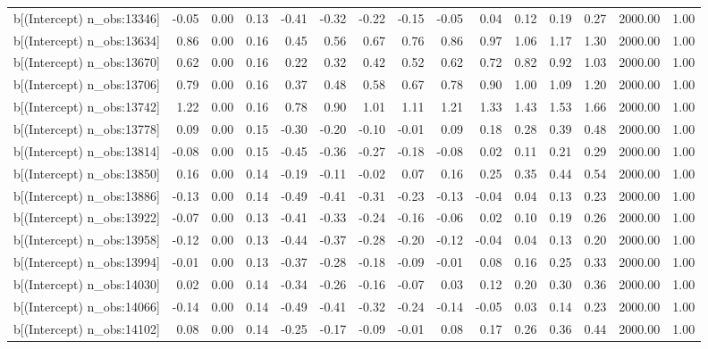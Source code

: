 \begin{table}[ht]
\begin{tabular}{rrrrrrrrrrrrrrr}
  b[(Intercept) n\_obs:13346] & -0.05 & 0.00 & 0.13 & -0.41 & -0.32 & -0.22 & -0.15 & -0.05 & 0.04 & 0.12 & 0.19 & 0.27 & 2000.00 & 1.00 \\ 
  b[(Intercept) n\_obs:13634] & 0.86 & 0.00 & 0.16 & 0.45 & 0.56 & 0.67 & 0.76 & 0.86 & 0.97 & 1.06 & 1.17 & 1.30 & 2000.00 & 1.00 \\ 
  b[(Intercept) n\_obs:13670] & 0.62 & 0.00 & 0.16 & 0.22 & 0.32 & 0.42 & 0.52 & 0.62 & 0.72 & 0.82 & 0.92 & 1.03 & 2000.00 & 1.00 \\ 
  b[(Intercept) n\_obs:13706] & 0.79 & 0.00 & 0.16 & 0.37 & 0.48 & 0.58 & 0.67 & 0.78 & 0.90 & 1.00 & 1.09 & 1.20 & 2000.00 & 1.00 \\ 
  b[(Intercept) n\_obs:13742] & 1.22 & 0.00 & 0.16 & 0.78 & 0.90 & 1.01 & 1.11 & 1.21 & 1.33 & 1.43 & 1.53 & 1.66 & 2000.00 & 1.00 \\ 
  b[(Intercept) n\_obs:13778] & 0.09 & 0.00 & 0.15 & -0.30 & -0.20 & -0.10 & -0.01 & 0.09 & 0.18 & 0.28 & 0.39 & 0.48 & 2000.00 & 1.00 \\ 
  b[(Intercept) n\_obs:13814] & -0.08 & 0.00 & 0.15 & -0.45 & -0.36 & -0.27 & -0.18 & -0.08 & 0.02 & 0.11 & 0.21 & 0.29 & 2000.00 & 1.00 \\ 
  b[(Intercept) n\_obs:13850] & 0.16 & 0.00 & 0.14 & -0.19 & -0.11 & -0.02 & 0.07 & 0.16 & 0.25 & 0.35 & 0.44 & 0.54 & 2000.00 & 1.00 \\ 
  b[(Intercept) n\_obs:13886] & -0.13 & 0.00 & 0.14 & -0.49 & -0.41 & -0.31 & -0.23 & -0.13 & -0.04 & 0.04 & 0.13 & 0.23 & 2000.00 & 1.00 \\ 
  b[(Intercept) n\_obs:13922] & -0.07 & 0.00 & 0.13 & -0.41 & -0.33 & -0.24 & -0.16 & -0.06 & 0.02 & 0.10 & 0.19 & 0.26 & 2000.00 & 1.00 \\ 
  b[(Intercept) n\_obs:13958] & -0.12 & 0.00 & 0.13 & -0.44 & -0.37 & -0.28 & -0.20 & -0.12 & -0.04 & 0.04 & 0.13 & 0.20 & 2000.00 & 1.00 \\ 
  b[(Intercept) n\_obs:13994] & -0.01 & 0.00 & 0.13 & -0.37 & -0.28 & -0.18 & -0.09 & -0.01 & 0.08 & 0.16 & 0.25 & 0.33 & 2000.00 & 1.00 \\ 
  b[(Intercept) n\_obs:14030] & 0.02 & 0.00 & 0.14 & -0.34 & -0.26 & -0.16 & -0.07 & 0.03 & 0.12 & 0.20 & 0.30 & 0.36 & 2000.00 & 1.00 \\ 
  b[(Intercept) n\_obs:14066] & -0.14 & 0.00 & 0.14 & -0.49 & -0.41 & -0.32 & -0.24 & -0.14 & -0.05 & 0.03 & 0.14 & 0.23 & 2000.00 & 1.00 \\ 
  b[(Intercept) n\_obs:14102] & 0.08 & 0.00 & 0.14 & -0.25 & -0.17 & -0.09 & -0.01 & 0.08 & 0.17 & 0.26 & 0.36 & 0.44 & 2000.00 & 1.00 \\ 

\end{tabular}
\end{table}
